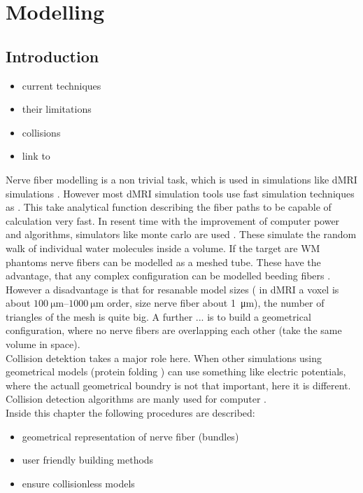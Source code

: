 \setcounter{chapter}{4}
\chapter{Modelling}
\label{chap:modelling}
% 
\section{Introduction}
\cite{Balls2009}
% 
\begin{itemize}[nosep]
    \item current techniques
    \item their limitations
    \item collisions
    \item link to \cite{matuschke2019}
\end{itemize}
% 
Nerve fiber modelling is a non trivial task, which is  used in simulations like \ac{dMRI} simulations \dummy. However most \ac{dMRI} simulation tools use fast simulation techniques as \dummy. This take analytical function describing the fiber paths to be capable of calculation very fast.
% 
In resent time with the improvement of computer power and algorithms, simulators like monte carlo are used \dummy. These simulate the random walk of individual water molecules inside a volume. If the target are \ac{WM} phantoms nerve fibers can be modelled as a meshed tube.
These have the advantage, that any complex configuration can be modelled \eg beeding fibers \dummy.\\
%
However a disadvantage is that for resanable model sizes ( in \ac{dMRI} a voxel is about $\SIrange{100}{1000}{\micro\meter}$ order, size nerve fiber about \SI{1}{\micro\meter}), the number of triangles of the mesh is quite big.
A further ... is to build a geometrical configuration, where no nerve fibers are overlapping each other (\ie  take the same volume in space). \\
% 
Collision detektion takes a major role here.
When other simulations using geometrical models (\eg protein folding \dummy) can use something like electric potentials, where the actuall geometrical boundry is not that important, here it is different.
Collision detection algorithms are manly used for computer \dummy.\\
% 
Inside this chapter the following procedures are described:
\begin{itemize}[nosep]
    \item geometrical representation of nerve fiber (bundles)
    \item user friendly building methods
    \item ensure collisionless models
\end{itemize}
